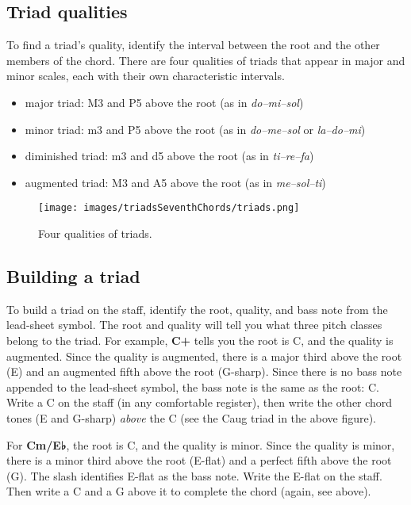 \documentclass{book}
\providecommand{\tightlist}{%
  \setlength{\itemsep}{0pt}\setlength{\parskip}{0pt}}
\begin{document}
\hypertarget{triad-qualities-1}{%
\subsection{Triad qualities}\label{triad-qualities-1}}

To find a triad's quality, identify the interval between the root and the
other members of the chord. There are four qualities of triads that appear in
major and minor scales, each with their own characteristic intervals.

\begin{itemize}
\tightlist
\item
  major triad: M3 and P5 above the root (as in \emph{do--mi--sol})
\item
  minor triad: m3 and P5 above the root (as in \emph{do--me--sol} or
  \emph{la--do--mi})
\item
  diminished triad: m3 and d5 above the root (as in \emph{ti--re--fa})
\item
  augmented triad: M3 and A5 above the root (as in \emph{me--sol--ti})
\end{itemize}

\begin{figure}
\centering
\texttt{[image: images/triadsSeventhChords/triads.png]}
\caption{Four qualities of triads.}
\end{figure}

\hypertarget{building-a-triad}{%
\subsection{Building a triad}\label{building-a-triad}}

To build a triad on the staff, identify the root, quality, and bass note from
the lead-sheet symbol. The root and quality will tell you what three pitch
classes belong to the triad. For example, \textbf{C+} tells you the root is C,
and the quality is augmented. Since the quality is augmented, there is a major
third above the root (E) and an augmented fifth above the root (G-sharp).
Since there is no bass note appended to the lead-sheet symbol, the bass note
is the same as the root: C. Write a C on the staff (in any comfortable
register), then write the other chord tones (E and G-sharp) \emph{above} the C
(see the Caug triad in the above figure).

For \textbf{Cm/E♭}, the root is C, and the quality is minor. Since the quality
is minor, there is a minor third above the root (E-flat) and a perfect fifth
above the root (G). The slash identifies E-flat as the bass note. Write the
E-flat on the staff. Then write a C and a G above it to complete the chord
(again, see above).
\end{document}
